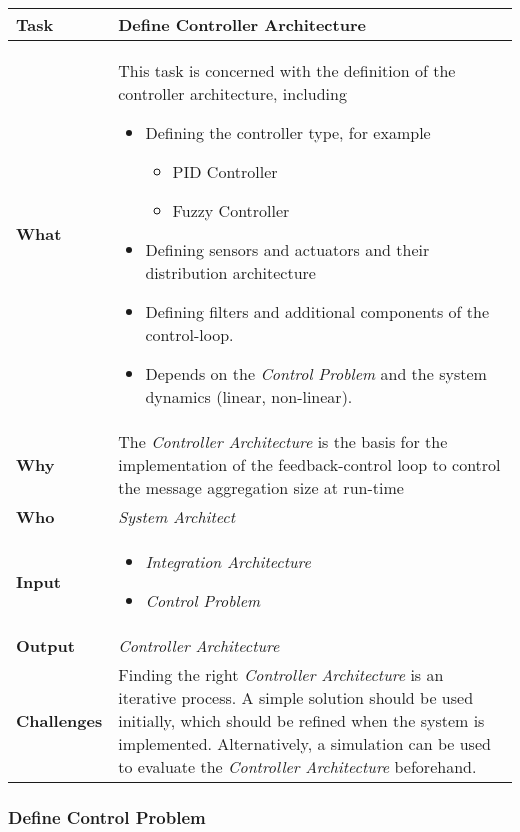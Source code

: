\begin{tabularx}{\textwidth}{@{} l X @{}}
	\caption{Define Controller Architecture} \label{table:ch6_Task_Define_Controller_Architecture}\\
	\toprule 
	\bfseries Task & Define Controller Architecture\\
	\midrule 
	\bfseries What & 
	This task is concerned with the definition of the controller architecture, including
	\begin{itemize}
		\item Defining the controller type, for example
		\begin{itemize}
			\item PID Controller
			\item Fuzzy Controller
		\end{itemize}
		\item Defining sensors and actuators and their distribution architecture
		\item Defining filters and additional components of the control-loop.
		\item Depends on the \emph{Control Problem} and the system dynamics (linear, non-linear).
	\end{itemize}
	\\
	\midrule 
	\bfseries Why & The \emph{Controller Architecture} is the basis for the implementation of the feedback-control loop to control the message aggregation size at run-time\\
	\midrule
	\bfseries Who & \emph{System Architect}\\
	\midrule 
	\bfseries Input & 
	\begin{itemize}
		\item \emph{Integration Architecture}
		\item \emph{Control Problem}
	\end{itemize}\\
	\midrule 
	\bfseries Output & \emph{Controller Architecture}\\
	\midrule 
	\bfseries Challenges & Finding the right \emph{Controller Architecture} is an iterative process. A simple solution should be used initially, which should be refined when the system is implemented. Alternatively, a simulation can be used to evaluate the \emph{Controller Architecture} beforehand.\\
	\bottomrule 
\end{tabularx}

\subsubsection{Define Control Problem}

